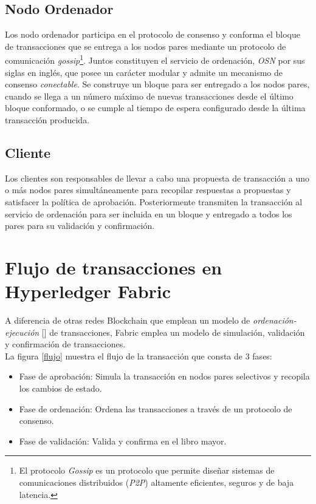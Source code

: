 \subsection{Nodo Ordenador}
Los nodo ordenador participa en el protocolo de consenso y conforma el bloque de transacciones que se entrega a los nodos pares mediante un protocolo de comunicaci\'on \emph{gossip}\footnote{El protocolo \emph{Gossip} es un protocolo que permite dise\~nar sistemas de comunicaciones distribuidos (\emph{P2P}) altamente eficientes, seguros y de baja latencia.}. Juntos constituyen el servicio de ordenaci\'on, \emph{OSN} por sus siglas en ingl\'es, que posee un car\'acter modular y admite un mecanismo de consenso \emph{conectable}. Se construye un bloque para ser entregado a los nodos pares, cuando se llega a un n\'umero m\'aximo de nuevas transacciones desde el \'ultimo bloque conformado, o se cumple al tiempo de espera configurado desde la \'ultima transacci\'on producida.

\subsection{Cliente}
Los clientes son responsables de llevar a cabo una propuesta de transacci\'on a uno o m\'as nodos pares simult\'aneamente para recopilar respuestas a propuestas y satisfacer la pol\'itica de aprobaci\'on. Posteriormente transmiten la transacci\'on al servicio de ordenaci\'on para ser incluida en un bloque y entregado a todos los pares para su validaci\'on y confirmaci\'on.

\section{Flujo de transacciones en Hyperledger Fabric}
A diferencia de otras redes Blockchain que emplean un modelo de \emph{ordenaci\'on-ejecución} [\cite{vukolic2017rethinking}] de transacciones, Fabric emplea un modelo de simulaci\'on, validaci\'on y confirmaci\'on de transacciones.\\ 

La figura \ref{flujo} muestra el flujo de la transacci\'on que consta de 3 fases:
\begin{itemize}
\item[1] Fase de aprobaci\'on: Simula la transacci\'on en nodos pares selectivos y recopila los cambios de estado.
\item[2] Fase de ordenaci\'on: Ordena las transacciones a trav\'es de un protocolo de consenso.
\item[3] Fase de validaci\'on: Valida y confirma en el libro mayor.
\end{itemize}



